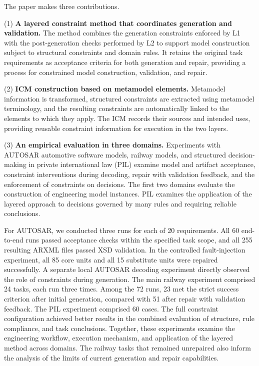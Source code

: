 \documentclass[pdflatex,iicol,sn-mathphys-num]{sn-jnl}
\begin{document}
The paper makes three contributions.

(1) \textbf{A layered constraint method that coordinates generation and validation.} The method combines the generation constraints enforced by L1 with the post-generation checks performed by L2 to support model construction subject to structural constraints and domain rules. It retains the original task requirements as acceptance criteria for both generation and repair, providing a process for constrained model construction, validation, and repair.

(2) \textbf{ICM construction based on metamodel elements.} Metamodel information is transformed, structured constraints are extracted using metamodel terminology, and the resulting constraints are automatically linked to the elements to which they apply. The ICM records their sources and intended uses, providing reusable constraint information for execution in the two layers.

(3) \textbf{An empirical evaluation in three domains.} Experiments with AUTOSAR automotive software models, railway models, and structured decision-making in private international law (PIL) examine model and artifact acceptance, constraint interventions during decoding, repair with validation feedback, and the enforcement of constraints on decisions. The first two domains evaluate the construction of engineering model instances. PIL examines the application of the layered approach to decisions governed by many rules and requiring reliable conclusions.

For AUTOSAR, we conducted three runs for each of 20 requirements. All 60 end-to-end runs passed acceptance checks within the specified task scope, and all 255 resulting ARXML files passed XSD validation. In the controlled fault-injection experiment, all 85 core units and all 15 substitute units were repaired successfully. A separate local AUTOSAR decoding experiment directly observed the role of constraints during generation. The main railway experiment comprised 24 tasks, each run three times. Among the 72 runs, 23 met the strict success criterion after initial generation, compared with 51 after repair with validation feedback. The PIL experiment comprised 60 cases. The full constraint configuration achieved better results in the combined evaluation of structure, rule compliance, and task conclusions. Together, these experiments examine the engineering workflow, execution mechanism, and application of the layered method across domains. The railway tasks that remained unrepaired also inform the analysis of the limits of current generation and repair capabilities.
\end{document}
